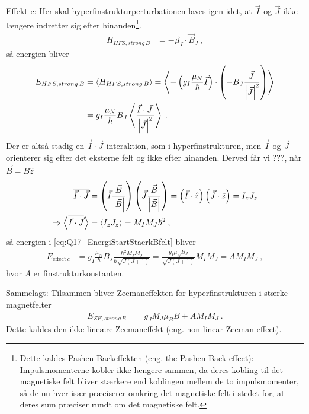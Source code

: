 \noindent\underline{Effekt c:} Her skal hyperfinstrukturperturbationen laves igen idet, at $\Vec{I}$ og $\Vec{J}$ ikke længere indretter sig efter hinanden\footnote{Dette kaldes Pashen-Backeffekten (eng. the Pashen-Back effect): Impulsmomenterne kobler ikke længere sammen, da deres kobling til det magnetiske felt bliver stærkere end koblingen mellem de to impulsmomenter, så de nu hver især præciserer omkring det magnetiske felt i stedet for, at deres sum præciser rundt om det magnetiske felt.}.
\begin{align}
    H_{HFS,strong\,B} &= - \Vec{\mu}_I \cdot \Vec{B}_J \: ,
\end{align}
så energien bliver
\begin{align} \label{eq:Q17_EnergiStartStaerkBfelt}
    E_{HFS,strong\,B} &= \Braket{H_{HFS,strong\,B}} = \Braket{- \left(g_I \frac{\mu_N}{\hbar}\Vec{I}\right) \cdot \left(- B_J\frac{\Vec{J} \:}{\abs{\Vec{J}}^2}\right)} \nonumber\\
    &= g_I \frac{\mu_N}{\hbar}B_J \Braket{\frac{\Vec{I} \cdot \Vec{J} \:}{\abs{\Vec{J}}^2}} \: .
\end{align}
Der er altså stadig en $\Vec{I} \cdot \Vec{J}$ interaktion, som i hyperfinstrukturen, men $\Vec{I}$ og $\Vec{J}$ orienterer sig efter det eksterne felt og ikke efter hinanden. Derved får vi ???, når $\Vec{B} = B \hat{z}$
\begin{align}
    \overline{\Vec{I} \cdot \Vec{J}} &= \left(\Vec{I}\frac{\Vec{B}}{\abs{\Vec{B}}}\right)\left(\Vec{J}\frac{\Vec{B}}{\abs{\Vec{B}}}\right) = \left(\Vec{I} \cdot \hat{z}\right)\left(\Vec{J} \cdot \hat{z}\right) = I_z J_z \\
    \Rightarrow \Braket{\overline{\Vec{I} \cdot \Vec{J}}} &= \Braket{I_z J_z} = M_I M_J \hbar^2 \: ,
\end{align}
så energien i \cref{eq:Q17_EnergiStartStaerkBfelt} bliver
\begin{align} \label{eq:Q17_EnergyFromEffectC}
    E_{\text{effect}\,c} &= g_I \frac{\mu_N}{\hbar}B_J \frac{\hbar^2 M_I M_J}{\hbar \sqrt{J(J+1)}} = \frac{g_I \mu_N B_J}{\sqrt{J(J+1)}} M_I M_J = A M_I M_J \: ,
\end{align}
hvor $A$ er finstrukturkonstanten.

\noindent\underline{Sammelagt:} Tilsammen bliver Zeemaneffekten for hyperfinstrukturen i stærke magnetfelter
\begin{align} \label{eq:EnergiskiftZeemanIHyperfinstrukturStarktFelt}
    E_{ZE,strong\,B} &= g_J M_J \mu_B B + A M_I M_J \: .
\end{align}
Dette kaldes den \textsf{ikke-lineære Zeemaneffekt} (eng. non-linear Zeeman effect).


